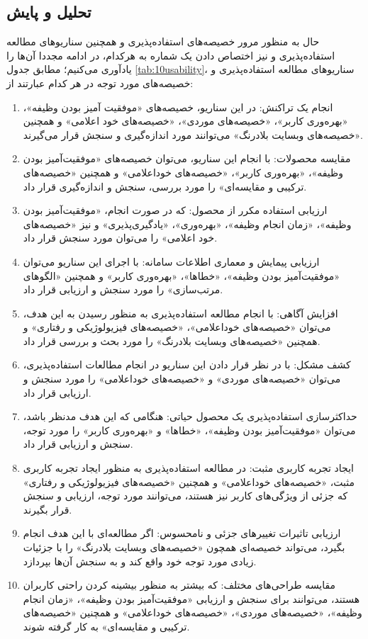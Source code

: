 \subsection{تحلیل و پایش}
حال به منظور مرور خصیصه‌های استفاده‌پذیری  و همچنین سناریوهای مطالعه استفاده‌پذیری و نیز اختصاص دادن یک شماره به هرکدام، در ادامه مجددا آن‌ها را یادآوری می‌کنیم؛ مطابق جدول
\ref{tab:10usability}،
سناریو‌های مطالعه استفاده‌پذیری و خصیصه‌های مورد توجه در هر کدام عبارتند از:
\begin{enumerate}
	\item
	انجام یک تراکنش: در این سناریو، خصیصه‌های «موفقیت آمیز بودن وظیفه»، «بهره‌وری کاربر»، «خصیصه‌های موردی»، «خصیصه‌های خود اعلامی» و همچنین «خصیصه‌های وبسایت بلادرنگ» می‌توانند مورد اندازه‌گیری و سنجش قرار می‌گیرند.
	\item
	مقایسه محصولات: با انجام این سناریو، می‌توان خصیصه‌های «موفقیت‌آمیز بودن وظیفه»، «بهره‌وری کاربر»، «خصیصه‌های خوداعلامی» و همچنین «خصیصه‌های ترکیبی و مقایسه‌ای» را مورد بررسی، سنجش و اندازه‌گیری قرار داد.
	\item
	ارزیابی استفاده مکرر از محصول: که در صورت انجام، «موفقیت‌آمیز بودن وظیفه»، «زمان انجام وظیفه»، «بهره‌وری»، «یادگیری‌پذیری» و نیز «خصیصه‌های خود اعلامی» را می‌توان مورد سنجش قرار داد.
	\item
	ارزیابی پیمایش و معماری اطلاعات سامانه: با اجرای این سناریو می‌توان «موفقیت‌آمیز بودن وظیفه»، «خطاها»، «بهره‌وری کاربر» و همچنین «الگوهای مرتب‌سازی» را مورد سنجش و ارزیابی قرار داد.
	\item
	افزایش آگاهی: با انجام مطالعه استفاده‌پذیری به منظور رسیدن به این هدف، می‌توان «خصیصه‌های خوداعلامی»، «خصیصه‌های فیزیولوژیکی و رفتاری» و همچنین «خصیصه‌های وبسایت‌ بلادرنگ» را مورد بحث و بررسی قرار داد.
	\item
	کشف مشکل: با در نظر قرار دادن این سناریو در انجام مطالعات استفاده‌پذیری، می‌توان «خصیصه‌های موردی» و «خصیصه‌های خوداعلامی» را مورد سنجش و ارزیابی قرار داد.
	\item 
	حداکثرسازی استفاده‌پذیری یک محصول حیاتی: هنگامی که این هدف مدنظر باشد، می‌توان «موفقیت‌آمیز بودن وظیفه»، «خطاها» و «بهره‌وری کاربر» را مورد توجه، سنجش و ارزیابی قرار داد.
	\item 
	ایجاد تجربه کاربری مثبت:
	در مطالعه استفاده‌پذیری به منظور ایجاد تجربه کاربری مثبت، «خصیصه‌های خوداعلامی» و همچنین «خصیصه‌های فیزیولوژیکی و رفتاری» که جزئی از ویژگی‌های کاربر نیز هستند، می‌توانند مورد توجه، ارزیابی و سنجش قرار بگیرند.
	\item 
	ارزیابی تاثیرات تغییرهای جزئی و نامحسوس: اگر مطالعه‌ای با این هدف انجام بگیرد، می‌تواند خصیصه‌ای همچون «خصیصه‌های وبسایت بلادرنگ» را با جزئیات زیادی مورد توجه خود واقع کند و به سنجش آن‌ها بپردازد.
	\item
	مقایسه طراحی‌های مختلف: که بیشتر به منظور بیشینه کردن راحتی کاربران هستند، می‌توانند برای سنجش و ارزیابی «موفقیت‌آمیز بودن وظیفه»‌، «زمان انجام وظیفه»، «خصیصه‌های موردی»، «خصیصه‌های خوداعلامی» و همچنین «خصیصه‌های ترکیبی و مقایسه‌ای» به کار گرفته شوند.
\end{enumerate}
